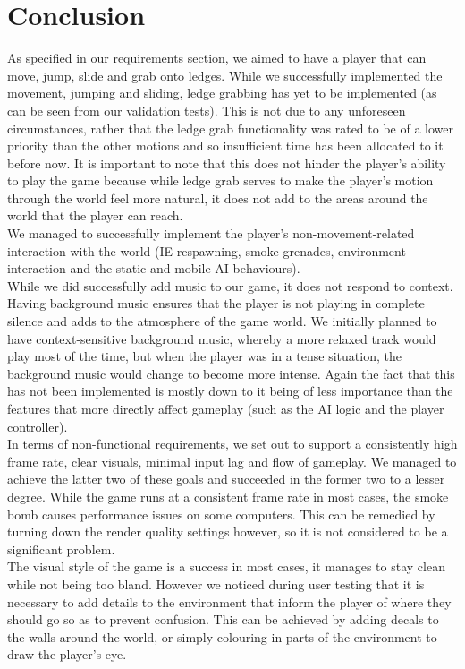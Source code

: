 \documentclass[11pt,a4paper]{article}
\begin{document}
\section{Conclusion}
As specified in our requirements section, we aimed to have a player that can move, jump, slide and grab onto ledges. While we successfully implemented the movement, jumping and sliding, ledge grabbing has yet to be implemented (as can be seen from our validation tests). This is not due to any unforeseen circumstances, rather that the ledge grab functionality was rated to be of a lower priority than the other motions and so insufficient time has been allocated to it before now.
It is important to note that this does not hinder the player's ability to play the game because while ledge grab serves to make the player's motion through the world feel more natural, it does not add to the areas around the world that the player can reach. \\
We managed to successfully implement the player's non-movement-related interaction with the world (IE respawning, smoke grenades, environment interaction and the static and mobile AI behaviours). \\
While we did successfully add music to our game, it does not respond to context. Having background music ensures that the player is not playing in complete silence and adds to the atmosphere of the game world. We initially planned to have context-sensitive background music, whereby a more relaxed track would play most of the time, but when the player was in a tense situation, the background music would change to become more intense.
Again the fact that this has not been implemented is mostly down to it being of less importance than the features that more directly affect gameplay (such as the AI logic and the player controller). \\
In terms of non-functional requirements, we set out to support a consistently high frame rate, clear visuals, minimal input lag and flow of gameplay. We managed to achieve the latter two of these goals and succeeded in the former two to a lesser degree.
While the game runs at a consistent frame rate in most cases, the smoke bomb causes performance issues on some computers. This can be remedied by turning down the render quality settings however, so it is not considered to be a significant problem. \\
The visual style of the game is a success in most cases, it manages to stay clean while not being too bland. However we noticed during user testing that it is necessary to add details to the environment that inform the player of where they should go so as to prevent confusion. This can be achieved by adding decals to the walls around the world, or simply colouring in parts of the environment to draw the player's eye.
\end{document}
